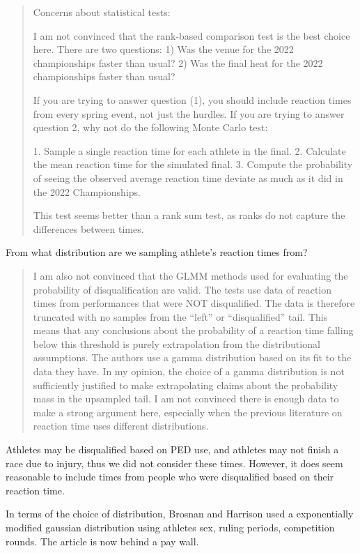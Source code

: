\documentclass[12pt]{article}
\newenvironment{comment}%
{\begin{quotation}\noindent\small\it\color{darkblue}\ignorespaces%
}{\end{quotation}}
\begin{document}
\begin{comment}
Concerns about statistical tests:

I am not convinced that the rank-based comparison test is the best choice here.
There are two questions: 1) Was the venue for the 2022 championships faster than
usual? 2) Was the final heat for the 2022 championships faster than usual?

If you are trying to answer question (1), you should include reaction times from
every spring event, not just the hurdles. If you are trying to answer question
2, why not do the following Monte Carlo test:

1. Sample a single reaction time for each athlete in the final.
2. Calculate the mean reaction time for the simulated final.
3. Compute the probability of seeing the observed average reaction time deviate
as much as it did in the 2022 Championships.

This test seems better than a rank sum test, as ranks do not capture the
differences between times.

\end{comment}

From what distribution are we sampling athlete's reaction times from?


\begin{comment}
I am also not convinced that the GLMM methods used for evaluating the
probability of disqualification are valid. The tests use data of reaction times
from performances that were NOT disqualified.  The data is therefore truncated
with no samples from the “left” or “disqualified” tail. This means that any
conclusions about the probability of a reaction time falling below this
threshold is purely extrapolation from the distributional assumptions. The
authors use a gamma distribution based on its fit to the data they have. In my
opinion, the choice of a gamma distribution is not sufficiently justified to
make extrapolating claims about the probability mass in the upsampled tail. I am
not convinced there is enough data to make a strong argument here, especially
when the previous literature on reaction time uses different distributions.
\end{comment}
Athletes may be disqualified based on PED use, and athletes may not finish a race
due to injury, thus we did not consider these times.  However, it does seem
reasonable to include times from people who were disqualified based on their
reaction time.

In terms of the choice of distribution, Brosnan and Harrison used a exponentially
modified gaussian distribution using athletes sex, ruling periods, competition
rounds. The article is now behind a pay wall.
\end{document}

